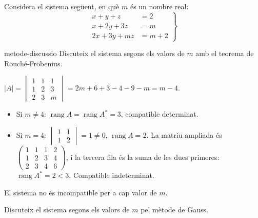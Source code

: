 Considera el sistema següent, en què $m$ és un nombre real:
\[
\left.\begin{aligned}
x+y+z&=2\\
x+2y+3z&=m\\
2x+3y+mz&=m+2
\end{aligned}\right\}
\]

\begin{apartats}

\begin{tria}{metode-discussio}
Discuteix el sistema segons els valors de $m$ amb el teorema de Rouché-Fröbenius.

\begin{solucio}
$|A|=\begin{vmatrix}1&1&1\\1&2&3\\2&3&m\end{vmatrix}=2m+6+3-4-9-m=m-4$.
\begin{itemize}
\item Si $m\ne4$: $\operatorname{rang}A=\operatorname{rang}A^*=3$, compatible determinat.
\item Si $m=4$: $\begin{vmatrix}1&1\\1&2\end{vmatrix}=1\ne0$, $\operatorname{rang}A=2$. La matriu ampliada és
$\left(\begin{array}{ccc|c}1&1&1&2\\1&2&3&4\\2&3&4&6\end{array}\right)$, i la tercera fila és la suma de
les dues primeres: $\operatorname{rang}A^*=2<3$. Compatible indeterminat.
\end{itemize}
El sistema no és incompatible per a cap valor de $m$.
\end{solucio}

Discuteix el sistema segons els valors de $m$ pel mètode de Gauss.


\end{tria}
\end{apartats}
